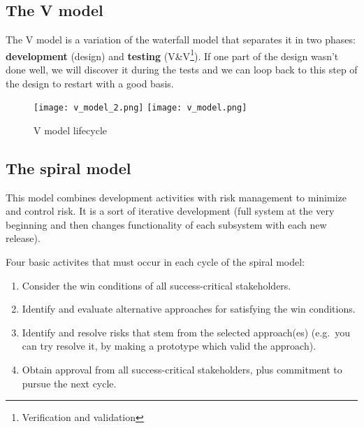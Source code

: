 \subsection{The V model} The V model is a variation of the waterfall model
that separates it in two phases: \textbf{development} (design) and
\textbf{testing} (V\&V\footnote{Verification and validation}). If one part
of the design wasn't done well, we will discover it during the tests and
we can loop back to this step of the design to restart with a good basis.

\begin{figure}[!ht]
    \centering
    \texttt{[image: v\_model\_2.png]}
    \texttt{[image: v\_model.png]}
    \caption{V model lifecycle}
\end{figure}

\subsection{The spiral model}

This model combines development activities with risk management to minimize and
control risk. It is a sort of iterative development (full system at the very
beginning and then changes functionality of each subsystem with each new
release). \newline

Four basic activites that must occur in each cycle of the spiral model:

\begin{enumerate}
    \item Consider the win conditions of all success-critical stakeholders.
    \item Identify and evaluate alternative approaches for satisfying the win
    conditions.
    \item Identify and resolve risks that stem from the selected approach(es)
    (e.g.\ you can try resolve it, by making a prototype which valid the
    approach).
    \item Obtain approval from all success-critical stakeholders, plus
    commitment to pursue the next cycle.
\end{enumerate}


